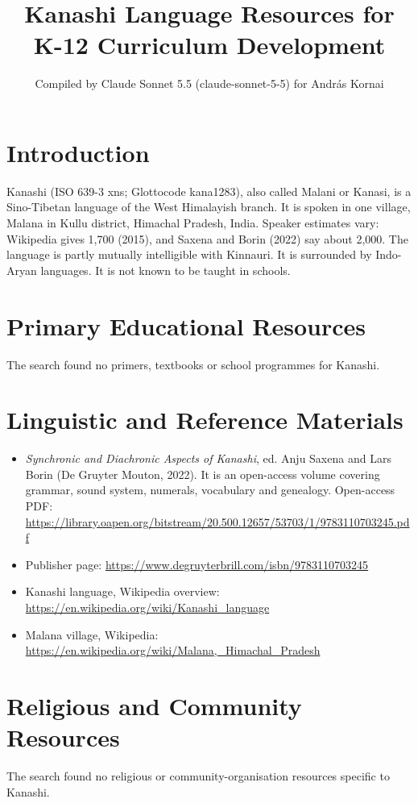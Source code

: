 \documentclass[12pt]{article}
\title{Kanashi Language Resources for K-12 Curriculum Development}
\author{Compiled by Claude Sonnet 5.5 (claude-sonnet-5-5) for Andr\'as Kornai}
\date{}
\begin{document}
\maketitle

\section{Introduction}
Kanashi (ISO 639-3 xns; Glottocode kana1283), also called Malani or Kanasi, is a Sino-Tibetan language of the West Himalayish branch. It is spoken in one village, Malana in Kullu district, Himachal Pradesh, India. Speaker estimates vary: Wikipedia gives 1,700 (2015), and Saxena and Borin (2022) say about 2,000. The language is partly mutually intelligible with Kinnauri. It is surrounded by Indo-Aryan languages. It is not known to be taught in schools.

\section{Primary Educational Resources}
The search found no primers, textbooks or school programmes for Kanashi.

\section{Linguistic and Reference Materials}
\begin{itemize}
\item \emph{Synchronic and Diachronic Aspects of Kanashi}, ed. Anju Saxena and Lars Borin (De Gruyter Mouton, 2022). It is an open-access volume covering grammar, sound system, numerals, vocabulary and genealogy. Open-access PDF: \url{https://library.oapen.org/bitstream/20.500.12657/53703/1/9783110703245.pdf}
\item Publisher page: \url{https://www.degruyterbrill.com/isbn/9783110703245}
\item Kanashi language, Wikipedia overview: \url{https://en.wikipedia.org/wiki/Kanashi_language}
\item Malana village, Wikipedia: \url{https://en.wikipedia.org/wiki/Malana,_Himachal_Pradesh}
\end{itemize}

\section{Religious and Community Resources}
The search found no religious or community-organisation resources specific to Kanashi.
\end{document}
